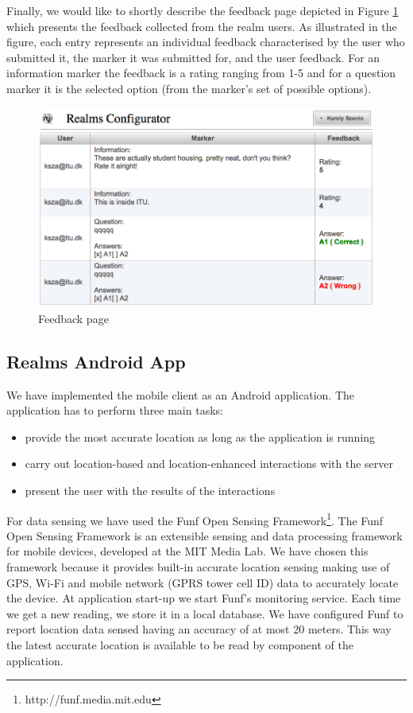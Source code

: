 \noindent Finally, we would like to shortly describe the feedback page depicted in Figure \ref{fig.feedback} which presents the feedback collected from the realm users. As illustrated in the figure, each entry represents an individual feedback characterised by the user who submitted it, the marker it was submitted for, and the user feedback. For an information marker the feedback is a rating ranging from 1-5 and for a question marker it is the selected option (from the marker's set of possible options).
\begin{figure}[H] 
	\centering
	\includegraphics[width=\linewidth]{fig/feedback.png}
	\caption{Feedback page}
	\label{fig.feedback}
\end{figure}


\subsection{Realms Android App}
\noindent We have implemented the mobile client as an Android application. The application has to perform three main tasks:
\begin{itemize}
	\item provide the most accurate location as long as the application is running
	\item carry out location-based and location-enhanced interactions with the server
	\item present the user with the results of the interactions
\end{itemize}

\noindent For data sensing we have used the Funf Open Sensing Framework\footnote{http://funf.media.mit.edu}. The Funf Open Sensing Framework is an extensible sensing and data processing framework for mobile devices, developed at the MIT Media Lab. We have chosen this framework because it provides built-in accurate location sensing making use of GPS, Wi-Fi and mobile network (GPRS tower cell ID) data to accurately locate the device. At application start-up we start Funf's monitoring service. Each time we get a new reading, we store it in a local database. We have configured Funf to report location data sensed having an accuracy of at most 20 meters. This way the latest accurate location is available to be read by component of the application.
\\


